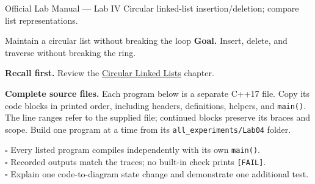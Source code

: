 
\begin{sourcealignment}{Official Lab Manual --- Lab IV}
Circular linked-list insertion/deletion; compare list representations.
\end{sourcealignment}

\begin{labproject}{Maintain a circular list without breaking the loop}
\textbf{Goal.} Insert, delete, and traverse without breaking the ring.

\textbf{Recall first.} Review the \hyperref[ch:circular-list]{Circular Linked Lists} chapter.

\textbf{Complete source files.} Each program below is a separate C++17 file.
Copy its code blocks in printed order, including headers, definitions, helpers, and \texttt{main()}.
The line ranges refer to the supplied file; continued blocks preserve its braces and scope.
Build one program at a time from its \texttt{all\_experiments/Lab04} folder.



\tcbbreak

\end{labproject}

\begin{verification}
$\square$ Every listed program compiles independently with its own \texttt{main()}.\\
$\square$ Recorded outputs match the traces; no built-in check prints \texttt{[FAIL]}.\\
$\square$ Explain one code-to-diagram state change and demonstrate one additional test.
\end{verification}
